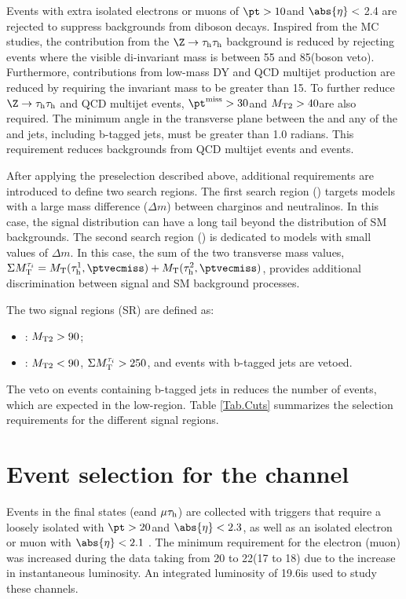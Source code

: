 Events with extra isolated electrons or muons of $\pt > 10$\GeV and $\abs{\eta} <$ 2.4
are rejected to suppress backgrounds from diboson decays.
Inspired from the MC studies,
the contribution from the $\Z \to \tauTau$  background is reduced by rejecting events
where the visible di-\Tau invariant mass is between 55 and 85\GeV (\Z boson veto).
Furthermore, contributions from low-mass DY and QCD multijet production are
reduced by requiring the invariant mass to be greater than 15\GeV.
To further reduce  $\Z\to \tauTau$ and QCD multijet events,
$\MPT > 30$\GeV and ${M_\mathrm{ T2}} > 40$\GeV are also required.
The minimum angle \deltaphi in the transverse plane between the \ptvecmiss and any of the \Tau and jets,
including b-tagged jets, must be greater than 1.0 radians.
This requirement reduces backgrounds from QCD multijet events and \wjets events.

After applying the preselection described above,
additional requirements are introduced to define two search regions.
The first search region (\binone) targets models with a large mass difference ($\Delta m$)
between charginos and neutralinos.
In this case, the \mttwo signal distribution can have a long tail beyond the
distribution of SM backgrounds.
The second search region (\bintwo) is dedicated to models with small values of $\Delta m$.
In this case, the sum of the two transverse mass values, $\SumMT = \mt(\Tau^1,\ptvecmiss) + \mt(\Tau^2,\ptvecmiss)$,
provides additional discrimination between signal and SM background processes.

The two signal regions (SR) are defined as:
\begin{itemize}
\item {\binone}: ${M_\mathrm{ T2}} > 90$\GeV;
\item {\bintwo}:  ${M_\mathrm{ T2}} < 90$\GeV, $\Sigma M_\mathrm{T}^{\tau_i} > 250$\GeV, and events with b-tagged jets are vetoed.
\end{itemize}
The veto on events containing b-tagged jets in \bintwo reduces the number of \ttbar events, which are expected in  the low-\mttwo region.
Table \ref{Tab.Cuts} summarizes the selection requirements for the different signal regions.
\section{\texorpdfstring{Event selection for the \leptonTau channel}{Event selection for the lepton-tau channel}}
\label{sect:eleTauCuts}
Events in the \leptonTau final states (e\Tau and $\mu\tau_\mathrm{h}$)
are collected with triggers that require
a loosely isolated \Tau with $\pt > 20$\GeV and $\abs{\eta}< 2.3$, as well as
an isolated electron or muon with $\abs{\eta} < 2.1$ \cite{Chatrchyan:2011nv,Khachatryan:2015hwa,Chatrchyan:2012xi}.  The minimum
\pt requirement for the electron (muon) was increased during the data taking from 20 to 22\GeV (17 to 18\GeV)
due to the increase in instantaneous luminosity. An integrated luminosity of 19.6\fbinv is used to study these channels.


